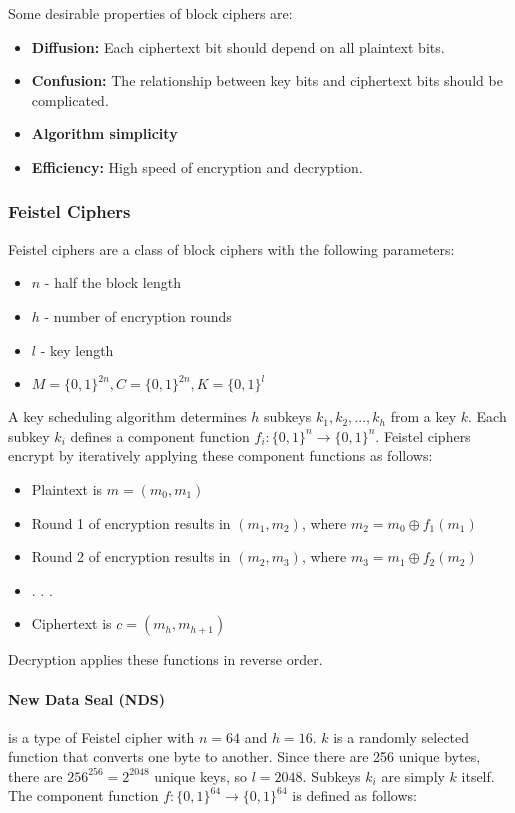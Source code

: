 \documentclass[12pt,titlepage]{article}
\begin{document}
      Some desirable properties of block ciphers are:
      \begin{itemize}
        \item \textbf{Diffusion:} Each ciphertext bit should depend on all plaintext bits.
        \item \textbf{Confusion:} The relationship between key bits and ciphertext bits should be complicated.
        \item \textbf{Algorithm simplicity}
        \item \textbf{Efficiency:} High speed of encryption and decryption.
      \end{itemize}

      \subsubsection{Feistel Ciphers}
        Feistel ciphers are a class of block ciphers with the following parameters:
        \begin{itemize}
          \item $n$ - half the block length
          \item $h$ - number of encryption rounds
          \item $l$ - key length
          \item $M = \{0, 1\}^{2n}, C = \{0, 1\}^{2n}, K = \{0, 1\}^{l}$
        \end{itemize}

        A key scheduling algorithm determines $h$ subkeys $k_1, k_2, ..., k_h$ from a key $k$. Each subkey $k_i$ defines a component function
        $f_i : \{0, 1\}^n \rightarrow \{0, 1\}^n$. Feistel ciphers encrypt by iteratively applying these component functions as follows:
        \begin{itemize}
          \item Plaintext is $m = (m_0, m_1)$
          \item Round 1 of encryption results in $(m_1, m_2)$, where $m_2 = m_0 \oplus f_1(m_1)$
          \item Round 2 of encryption results in $(m_2, m_3)$, where $m_3 = m_1 \oplus f_2(m_2)$
          \item . . .
          \item Ciphertext is $c = (m_h, m_{h+1})$
        \end{itemize}

        Decryption applies these functions in reverse order.

        \paragraph{New Data Seal (NDS)} is a type of Feistel cipher with $n = 64$ and $h = 16$. $k$ is a randomly selected function that converts one byte to
        another. Since there are 256 unique bytes, there are $256^{256} = 2^{2048}$ unique keys, so $l = 2048$. Subkeys $k_i$ are simply $k$ itself. The component
        function $f : \{0, 1\}^{64} \rightarrow \{0, 1\}^{64}$ is defined as follows:
\end{document}
